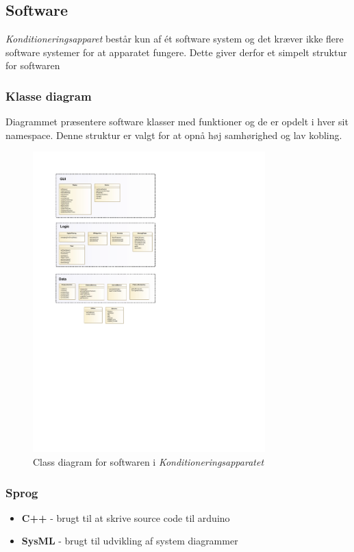 \subsection{Software}
\textit{Konditioneringsapparet} består kun af ét software system og det kræver ikke flere software systemer for at apparatet fungere. Dette giver derfor et simpelt struktur for softwaren 

\subsubsection{Klasse diagram}
Diagrammet præsentere software klasser med funktioner og de er opdelt i hver sit namespace. Denne struktur er valgt for at opnå høj samhørighed og lav kobling.
\begin{figure}[H]
	\centering
	\includegraphics[width=0.8\textwidth]{SystemArkitektur/pdfs/ClassDiagram.pdf}
	\caption{Class diagram for softwaren i \textit{Konditioneringsapparatet}}
\end{figure}


\subsubsection{Sprog}
\begin{itemize}
	\item \textbf{C++} - brugt til at skrive source code til arduino
	\item \textbf{SysML} - brugt til udvikling af system diagrammer
\end{itemize}

